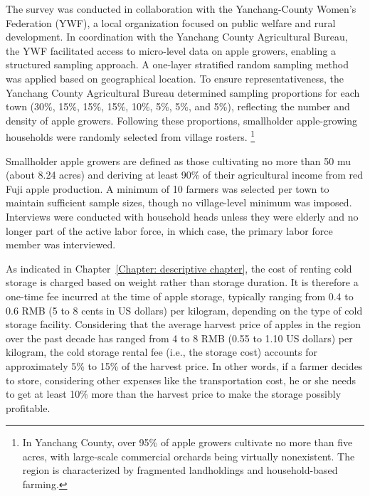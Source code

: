 The survey was conducted in collaboration with the Yanchang-County Women's Federation (YWF), a local organization focused on public welfare and rural development. In coordination with the Yanchang County Agricultural Bureau, the YWF facilitated access to micro-level data on apple growers, enabling a structured sampling approach. A one-layer stratified random sampling method was applied based on geographical location. To ensure representativeness, the Yanchang County Agricultural Bureau determined sampling proportions for each town (30\%, 15\%, 15\%, 15\%, 10\%, 5\%, 5\%, and 5\%), reflecting the number and density of apple growers. Following these proportions, smallholder apple-growing households were randomly selected from village rosters. \footnote{In Yanchang County, over 95\% of apple growers cultivate no more than five acres, with large-scale commercial orchards being virtually nonexistent. The region is characterized by fragmented landholdings and household-based farming.}  

Smallholder apple growers are defined as those cultivating no more than 50 mu (about 8.24 acres) and deriving at least 90\% of their agricultural income from red Fuji apple production. A minimum of 10 farmers was selected per town to maintain sufficient sample sizes, though no village-level minimum was imposed. Interviews were conducted with household heads unless they were elderly and no longer part of the active labor force, in which case, the primary labor force member was interviewed.  

As indicated in Chapter~\ref{Chapter: descriptive chapter}, the cost of renting cold storage is charged based on weight rather than storage duration. It is therefore a one-time fee incurred at the time of apple storage, typically ranging from 0.4 to 0.6 RMB (5 to 8 cents in US dollars) per kilogram, depending on the type of cold storage facility. Considering that the average harvest price of apples in the region over the past decade has ranged from 4 to 8 RMB (0.55 to 1.10 US dollars) per kilogram, the cold storage rental fee (i.e., the storage cost) accounts for approximately 5\% to 15\% of the harvest price. In other words, if a farmer decides to store, considering other expenses like the transportation cost, he or she needs to get at least 10\% more than the harvest price to make the storage possibly profitable.

